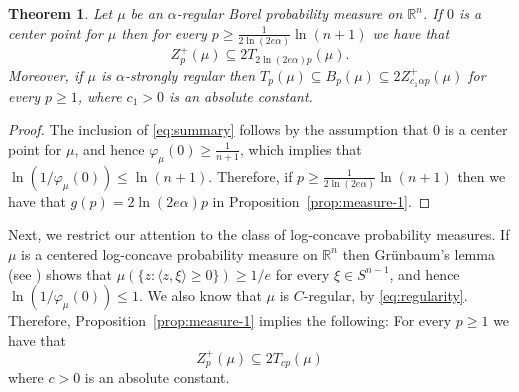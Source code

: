 \documentclass[11pt,leqno]{article}
\newtheorem{theorem}{Theorem}[section]
\theoremstyle{definition}
\theoremstyle{remark}
\numberwithin{equation}{section}
\newcommand{\ls}{\leqslant}
\newcommand{\gr}{\geqslant}
\newcommand{\1}{\textbf{1}}
\begin{document}
\begin{theorem}\label{th:summary-regular}
Let $\mu$ be an $\alpha$-regular Borel probability measure on $\mathbb{R}^n$. If $0$ is a center point for
$\mu$ then for every $p\gr \frac{1}{2\ln (2e\alpha )}\ln (n+1)$ we have that
\begin{equation}\label{eq:summary}Z_p^+(\mu)\subseteq 2T_{2\ln(2e\alpha )p}(\mu).\end{equation}
Moreover, if $\mu$ is $\alpha $-strongly regular then
$T_p(\mu)\subseteq B_p(\mu) \subseteq 2Z_{c_1\alpha p}^+(\mu)$ for every $p\gr 1$, where $c_1>0$ is an
absolute constant.
\end{theorem}

\begin{proof}The inclusion of \eqref{eq:summary} follows by the assumption that $0$ is a center point for $\mu$,
and hence $\varphi_{\mu}(0)\gr\frac{1}{n+1}$, which implies that $\ln(1/\varphi_{\mu}(0))\ls\ln (n+1)$.
Therefore, if $p\gr \frac{1}{2\ln (2e\alpha )}\ln (n+1)$ then we have that
$g(p)=2\ln(2e\alpha )p$ in Proposition~\ref{prop:measure-1}.
\end{proof}



Next, we restrict our attention to the class of log-concave probability measures. If $\mu$ is a centered log-concave
probability measure on $\mathbb{R}^n$ then Gr\"{u}nbaum's lemma (see \cite[Lemma~2.2.6]{BGVV-book}) shows that
$\mu(\{z:\langle z,\xi \rangle\gr 0\})\gr 1/e$ for every $\xi\in S^{n-1}$, and hence $\ln(1/\varphi_{\mu}(0))\ls 1$.
We also know that $\mu$ is $C$-regular, by \eqref{eq:regularity}.
Therefore, Proposition~\ref{prop:measure-1} implies the following: For every $p\gr 1$ we have that
\begin{equation}\label{eq:log-concave-1}Z_p^+(\mu)\subseteq 2T_{cp}(\mu)\end{equation}
where $c>0$ is an absolute constant.
\end{document}
